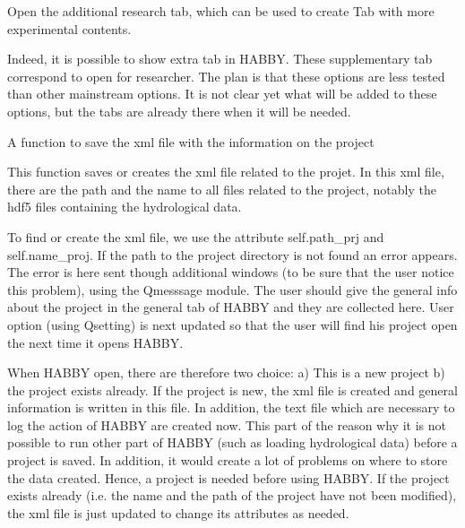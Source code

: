\documentclass[letterpaper,10pt,english]{sphinxmanual}
\begin{document}
\begin{fulllineitems}
\begin{fulllineitems}
\begin{quote}
\begin{description}
\end{description}\end{quote}

\end{fulllineitems}


\begin{fulllineitems}
\label{\detokenize{index:src_GUI.Main_windows_1.MainWindows.open_rech}}
Open the additional research tab, which can be used to create Tab with more experimental contents.

Indeed, it is possible to show extra tab in HABBY. These supplementary tab correspond to open for researcher.
The plan is that these options are less tested than other mainstream options. It is not clear yet what
will be added to these options, but the tabs are already there when it will be needed.

\end{fulllineitems}


\begin{fulllineitems}
\label{\detokenize{index:src_GUI.Main_windows_1.MainWindows.save_project}}
A function to save the xml file with the information on the project


This function saves or creates the xml file related to the projet. In this xml file, there are the path and
the name to all files related to the project, notably the hdf5 files containing the hydrological data.

To find or create the xml file, we use the attribute self.path\_prj and self.name\_proj. If the path to
the project directory is not found an error appears. The error is here sent though additional windows
(to be sure that the user notice this problem), using the Qmesssage module. The user should give the general
info about the project in the general tab of HABBY and they are collected here. User option (using Qsetting)
is next updated so that the user will find his project open the next time it opens HABBY.

When HABBY open, there are therefore  two choice: a) This is a new project b) the project exists already.
If the project is new, the xml file is created and general information is written in this file. In addition,
the text file which are necessary to log the action of HABBY are created now. This part of the reason why it
is not possible to run other part of HABBY (such as loading hydrological data) before a project is saved.
In addition, it would create a lot of problems on where to store the data created. Hence, a project is needed
before using HABBY. If the project exists already (i.e. the name and the path of the project have not been
modified), the xml file is just updated to change its attributes as needed.


\end{fulllineitems}
\end{fulllineitems}
\end{document}
